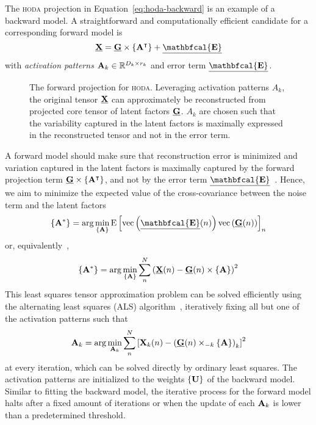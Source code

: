 \documentclass[twocolumn]{article}
\begin{document}
The \textsc{hoda} projection in Equation~\ref{eq:hoda-backward} is an example
of a backward model.
A straightforward and computationally efficient candidate for a corresponding
forward model is
\begin{equation}
	\ten{X} = \ten{G}\mmpr{\mat{A}^\intercal} + \ten{\mathbfcal{E}}
	\label{eq:hoda-forward}
\end{equation}
with \textit{activation patterns} $\mat{A}_k \in \mathbb{R}^{D_k\times r_k}$
and error term $\ten{\mathbfcal{E}}$.
\begin{figure}
	\centering
	
	\caption{The forward projection for \textsc{hoda}. Leveraging activation
		patterns $A_k$, the original tensor $\ten{X}$ can approximately be
		reconstructed from projected core tensor of latent factors $\ten{G}$. $A_k$ are chosen such
		that the variability captured in the latent factors is maximally expressed in
		the reconstructed tensor and not in the error term.}
	\label{fig:hoda-forward}
\end{figure}

A forward model should make sure that reconstruction error is minimized and
variation captured in the latent factors is maximally captured by the forward
projection term $\ten{G}\mmpr{\mat{A}^\intercal}$, and not by the error term
$\ten{\mathbfcal{E}}$~\cite{Haufe2014}.
Hence, we aim to minimize the expected value of the cross-covariance between
the noise term and the latent factors
\begin{equation}
  \left\{\mat{A}^*\right\} = \arg\min_{\{\mat{A}\}}\text{E}\left[\text{vec}\left({\ten{\mathbfcal{E}}(n)}\right)\text{vec}\left({\ten{G}(n)}\right)\right]_n
\end{equation}
or, equivalently~\cite{Parra2005,Haufe2014},
\begin{equation}
  \left\{\mat{A}^*\right\} = \arg\min_{\{\mat{A}\}}\sum_n^N\left(\ten{X}(n) - \ten{G}(n)\mmpr{\mat{A}}\right)^2
\end{equation}
This least squares tensor approximation problem can be solved efficiently using the
alternating least squares (ALS) algorithm~\cite{Comon2009},
iteratively fixing all but one of the activation patterns such that
\begin{equation}
  \mat{A}_k = \arg\min_{\mat{A}_k}
  \sum_n^N\left[\mat{X}_k(n) -
  \left(\ten{G}(n)\mmprs{\mat{A}}{k}\right)_k\right]^2
\end{equation}
at every iteration, which can be solved directly by ordinary least squares.
The activation patterns are initialized to the weights $\{\mat{U}\}$ of the
backward model.
Similar to fitting the backward model, the iterative process for the forward
model halts after a fixed amount of iterations or when the update of each
$\mat{A}_k$ is lower than a predetermined threshold.
\end{document}
